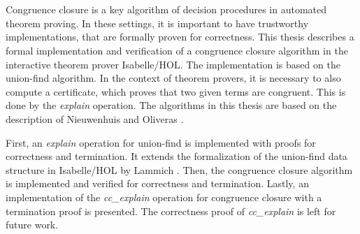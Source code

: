 \chapter{\abstractname}

Congruence closure is a key algorithm of decision procedures in automated theorem proving. In these settings, it is important to have trustworthy implementations, that are formally proven for correctness.
This thesis describes a formal implementation and verification of a congruence closure algorithm in the interactive theorem prover Isabelle/HOL.
The implementation is based on the union-find algorithm.
In the context of theorem provers, it is necessary to also compute a certificate, which proves that two given terms are congruent.
This is done by the \emph{explain} operation.
The algorithms in this thesis are based on the description of Nieuwenhuis and Oliveras \cite{Nieuwenhuis}.

First, an \emph{explain} operation for union-find is implemented with proofs for correctness and termination. It extends the formalization of the union-find data structure in Isabelle/HOL by Lammich \cite{unionfind-isabelle}.
Then, the congruence closure algorithm is implemented and verified for correctness and termination.
Lastly, an implementation of the \emph{cc\_explain} operation for congruence closure with a termination proof is presented.
The correctness proof of \emph{cc\_explain} is left for future work.

